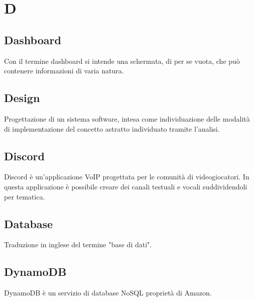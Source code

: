\section{D}
	\subsection{Dashboard}  
		Con il termine dashboard si intende una schermata, di per se vuota, che può contenere informazioni di varia natura.
	\subsection{Design}  
		Progettazione di un sistema software, intesa come individuazione delle modalità di implementazione del concetto astratto individuato tramite l'analisi.
	\subsection{Discord}  
		Discord è un'applicazione VoIP progettata per le comunità di videogiocatori. In questa applicazione è possibile creare dei canali testuali e vocali suddividendoli per tematica. 
    \subsection{Database}
        Traduzione in inglese del termine "base di dati".
    \subsection{DynamoDB}
        DynamoDB è un servizio di database NoSQL proprietà di Amazon.
\newpage